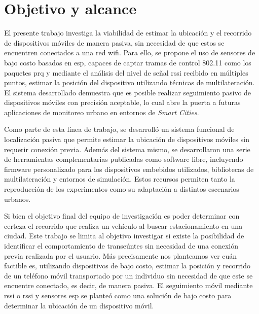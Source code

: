 \section{Objetivo y alcance}
El presente trabajo investiga la viabilidad de estimar la ubicación y el recorrido de dispositivos móviles de manera pasiva, sin necesidad de que estos se encuentren conectados a una red \acs{wifi}. Para ello, se propone el uso de sensores de bajo costo basados en \acs{esp}, capaces de captar tramas de control 802.11 como los paquetes \acl{prq} y mediante el análisis del nivel de señal \acs{rssi} recibido en múltiples puntos, estimar la posición del dispositivo utilizando técnicas de multilateración. El sistema desarrollado demuestra que es posible realizar seguimiento pasivo de dispositivos móviles con precisión aceptable, lo cual abre la puerta a futuras aplicaciones de monitoreo urbano en entornos de \textit{Smart Cities}.

Como parte de esta línea de trabajo, se desarrolló un sistema funcional de localización pasiva que permite estimar la ubicación de dispositivos móviles sin requerir conexión previa. Además del sistema mismo, se desarrollaron una serie de herramientas complementarias publicadas como software libre, incluyendo firmware personalizado para los dispositivos embebidos utilizados, bibliotecas de multilateración y entornos de simulación. Estos recursos permiten tanto la reproducción de los experimentos como su adaptación a distintos escenarios urbanos.

Si bien el objetivo final del equipo de investigación es poder determinar con certeza el recorrido que realiza un vehículo al buscar estacionamiento en una ciudad.
Este trabajo se limita al objetivo investigar si existe la posibilidad de identificar el comportamiento de transeúntes sin necesidad de una conexión previa realizada por el usuario. Más precisamente nos planteamos ver cuán factible es, utilizando dispositivos de bajo costo, estimar la posición y recorrido de un teléfono móvil transportado por un individuo sin necesidad de que este se encuentre conectado, es decir, de manera pasiva. El seguimiento móvil mediante \acs{rssi} o \acl{rssi} y sensores \acs{esp} se planteó como una solución de bajo costo para determinar la ubicación de un dispositivo móvil.

